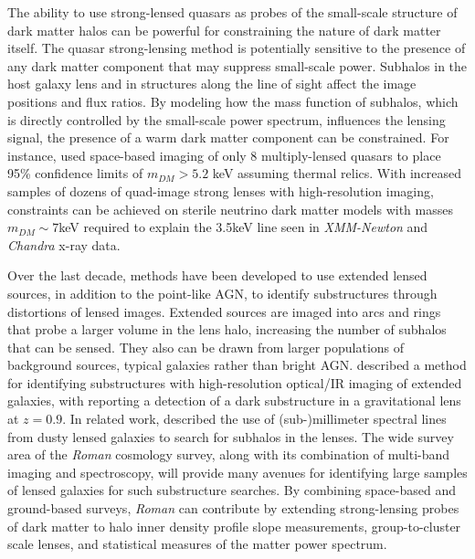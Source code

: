 \documentclass[11pt]{article}
\newcommand{\RST}{\emph{Roman}\xspace}
\begin{document}
The ability to use strong-lensed quasars as probes of the small-scale structure of dark matter halos
can be powerful for constraining the nature of dark matter itself. The quasar strong-lensing method is
potentially sensitive to the presence of any
dark matter component that may suppress small-scale power. Subhalos in the host galaxy lens and
in structures along the line of sight\citep{hsueh2020a} affect the image positions and flux ratios. By
modeling how the mass function of subhalos, which is directly controlled by the small-scale
power spectrum, influences the lensing signal, the presence of a warm dark matter component can
be constrained. For instance, \cite[Gilman et al. 2020][]{gilman2020a} used space-based imaging\citep{nierenberg2020a}
of only 8 multiply-lensed quasars to place 95\% confidence limits of $m_{DM}>5.2$ keV assuming thermal relics.
With increased samples of dozens of quad-image strong lenses with high-resolution imaging, constraints can be
achieved\citep{despali2020a} on sterile neutrino dark matter models with masses $m_{DM}\sim7$keV required to explain the 3.5keV line seen in \emph{XMM-Newton} and \emph{Chandra} x-ray
data\citep{bulbul2014a,boyarsky2015a,cappelluti2018a}.

Over the last decade, methods have been developed to use extended lensed sources, in addition to the
point-like AGN, to identify substructures through distortions of lensed images. Extended sources
are imaged into arcs and rings that probe a larger volume in the lens halo, increasing the number
of subhalos that can be sensed. They also can be drawn from larger populations of background
sources, typical galaxies rather than bright AGN. \cite[Vegetti \& Koopman (2009)][]{vegetti2009a} described a
method for identifying substructures with high-resolution optical/IR imaging of extended
galaxies, with \cite[Vegetti et al. (2012)][]{vegetti2012a} reporting a detection of a dark substructure in a gravitational
lens at $z=0.9$. 
In related work, \cite[Hezaveh et al. (2013, 2016a)][]{hezaveh2013a,hezaveh2016a} described the use of (sub-)millimeter
spectral lines from dusty lensed galaxies to search for subhalos in the lenses. The wide survey
area of the \RST cosmology survey, along with its combination of multi-band imaging and spectroscopy, will provide
many avenues for identifying large samples of lensed galaxies for such substructure searches.
By combining space-based and ground-based surveys\citep{agnello2018a,anguita2018a,everett2020a}, 
\RST can contribute by extending strong-lensing probes of dark matter to halo inner density
profile slope measurements\citep{gavazzi2007a,fiacconi2016a,wong2017a}, group-to-cluster scale lenses\citep{jaelani2020a},
and statistical measures of the matter power spectrum\citep{diaz_rivero2018a}.
\end{document}

